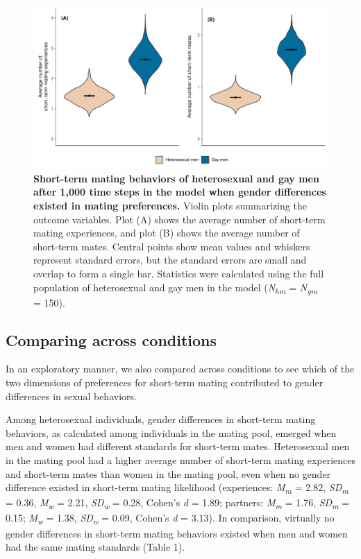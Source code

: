 \documentclass[
  11pt,
]{article}
\begin{document}
\begin{figure}[h]
  \centering
  \includegraphics[width=0.8\columnwidth]{figures/fig2_hetero_vs_gay_men.pdf}
  \caption{\textbf{Short-term mating behaviors of heterosexual and gay men after 1,000 time steps in the model when gender differences existed in mating preferences.} Violin plots summarizing the outcome variables. Plot (A) shows the average number of short-term mating experiences, and plot (B) shows the average number of short-term mates. Central points show mean values and whiskers represent standard errors, but the standard errors are small and overlap to form a single bar. Statistics were calculated using the full population of heterosexual and gay men in the model (\textit{N\textsubscript{hm}} = \textit{N\textsubscript{gm}} = 150).}
\end{figure}

\hypertarget{comparing-across-conditions}{%
\subsection{Comparing across
conditions}\label{comparing-across-conditions}}

In an exploratory manner, we also compared across conditions to see
which of the two dimensions of preferences for short-term mating
contributed to gender differences in sexual behaviors.

Among heterosexual individuals, gender differences in short-term mating
behaviors, as calculated among individuals in the mating pool, emerged
when men and women had different standards for short-term mates.
Heterosexual men in the mating pool had a higher average number of
short-term mating experiences and short-term mates than women in the
mating pool, even when no gender difference existed in short-term mating
likelihood (experiences: \emph{M\textsubscript{m}} = 2.82,
\emph{SD\textsubscript{m}} = 0.36, \emph{M\textsubscript{w}} = 2.21,
\emph{SD\textsubscript{w}} = 0.28, Cohen's \emph{d} = 1.89; partners:
\emph{M\textsubscript{m}} = 1.76, \emph{SD\textsubscript{m}} = 0.15;
\emph{M\textsubscript{w}} = 1.38, \emph{SD\textsubscript{w}} = 0.09,
Cohen's \emph{d} = 3.13). In comparison, virtually no gender differences
in short-term mating behaviors existed when men and women had the same
mating standards (Table 1).
\end{document}
